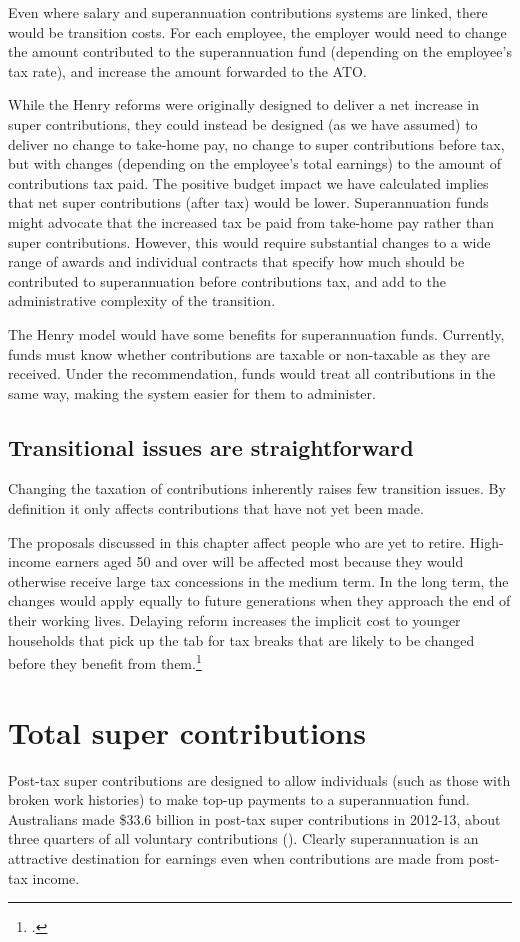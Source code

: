 \documentclass{grattanAlpha}
\begin{document}
Even where salary and superannuation contributions systems are linked, there would be transition costs. For each employee, the employer would need to change the amount contributed to the superannuation fund (depending on the employee’s tax rate), and increase the amount forwarded to the ATO. 

While the Henry reforms were originally designed to deliver a net increase in super contributions, they could instead be designed (as we have assumed) to deliver no change to take-home pay, no change to super contributions before tax, but with changes (depending on the employee’s total earnings) to the amount of contributions tax paid. The positive budget impact we have calculated implies that net super contributions (after tax) would be lower. Superannuation funds might advocate that the increased tax be paid from take-home pay rather than super contributions. However, this would require substantial changes to a wide range of awards and individual contracts that specify how much should be contributed to superannuation before contributions tax, and add to the administrative complexity of the transition.

The Henry model would have some benefits for superannuation funds. Currently, funds must know whether contributions are taxable or non-taxable as they are received. Under the recommendation, funds would treat all contributions in the same way, making the system easier for them to administer.

\section{Transitional issues are straightforward}
Changing the taxation of contributions inherently raises few transition issues. By definition it only affects contributions that have not yet been made.

The proposals discussed in this chapter affect people who are yet to retire. High-income earners aged 50 and over will be affected most because they would otherwise receive large tax concessions in the medium term. In the long term, the changes would apply equally to future generations when they approach the end of their working lives. Delaying reform increases the implicit cost to younger households that pick up the tab for tax breaks that are likely to be changed before they benefit from them.\footcite{DaleyWoodWeidmannEtAl2014}

\chapter{Total super contributions} 
Post-tax super contributions are designed to allow individuals (such as those with broken work histories) to make top-up payments to a superannuation fund. Australians made \$33.6 billion in post-tax super contributions in 2012-13, about three quarters of all voluntary contributions (). Clearly superannuation is an attractive destination for earnings even when contributions are made from post-tax income. 
\end{document}
